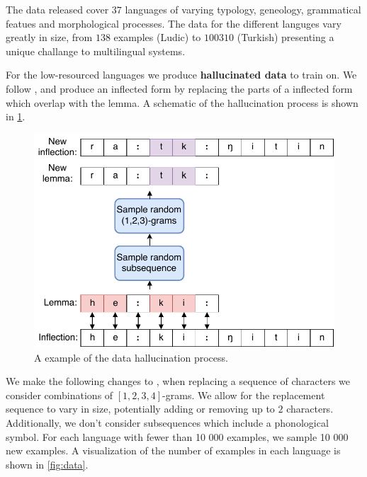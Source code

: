 \documentclass[11pt,a4paper]{article}
\begin{document}
The data released cover $37$ languages of varying typology, geneology,
grammatical featues and morphological processes. The data for the
different languges vary greatly in size, from $138$ examples (Ludic) to
$100310$ (Turkish) presenting a unique challange to multilingual
systems.

For the low-resourced languages we produce \textbf{hallucinated data}
to train on. We follow \cite{DBLP:conf/emnlp/AnastasopoulosN19}, and
produce an inflected form by replacing the parts of a inflected form
which overlap with the lemma.  A schematic of the hallucination
process is shown in \cref{fig:hall}.

\begin{figure}
\centering
\includegraphics[scale=0.5]{hall.pdf}
\caption{\label{fig:hall} A example of the data hallucination process.}
\end{figure}

We make the following changes to
\citep{DBLP:conf/emnlp/AnastasopoulosN19}, when replacing a sequence of
characters we consider combinations of $[1,2,3,4]$-grams. We allow for
the replacement sequence to vary in size, potentially adding or
removing up to $2$ characters. Additionally, we don't consider
subsequences which include a phonological symbol.  For each language
with fewer than 10 000 examples, we sample 10 000 new examples. A
visualization of the number of examples in each language is shown in
\cref{fig:data}.
\end{document}
